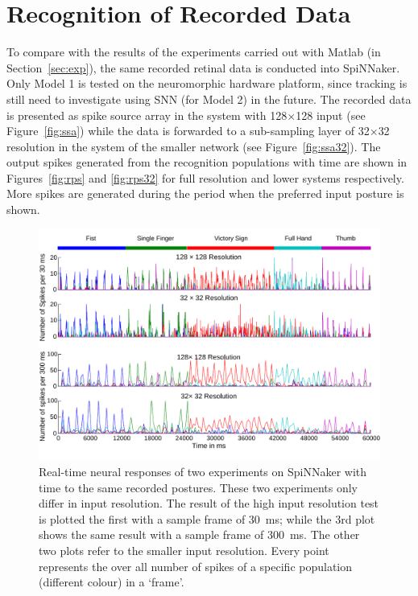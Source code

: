 \section{Recognition of Recorded Data}
To compare with the results of the experiments carried out with Matlab (in Section~\ref{sec:exp}), the same recorded retinal data is conducted into SpiNNaker.
Only Model 1 is tested on the neuromorphic hardware platform, since tracking is still need to investigate using SNN (for Model 2) in the future. 
The recorded data is presented as spike source array in the system with 128$\times$128 input (see Figure~\ref{fig:ssa}) while the data is forwarded to a sub-sampling layer of 32$\times$32 resolution in the system of the smaller network (see Figure~\ref{fig:ssa32}). 
The output spikes generated from the recognition populations with time are shown in Figures~\ref{fig:rps} and \ref{fig:rps32} for full resolution and lower systems respectively. 
More spikes are generated during the period when the preferred input posture is shown. 


\begin{figure}[h!]
\centering
	\includegraphics[width=\textwidth]{pics/rateSpiNN.pdf}
	\caption{Real-time neural responses of two experiments on SpiNNaker with time to the same recorded postures.
	These two experiments only differ in input resolution.
	The result of the high input resolution test is plotted the first with a sample frame of 30~ms; 
	while the 3rd plot shows the same result with a sample frame of 300~ms.
	The other two plots refer to the smaller input resolution.
	Every point represents the over all number of spikes of a specific population (different colour) in a `frame'.
	}
	\label{fig:spikerec}
\end{figure}

